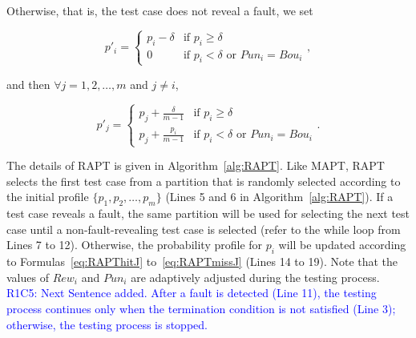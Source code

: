 \documentclass[10pt,journal,compsoc]{IEEEtran}
\begin{document}
Otherwise, that is, the test case does not reveal a fault, we set

\begin{equation}
\label{eq:RAPTmissI}
p'_i =
\begin{cases}
p_i - \delta & \text{if } p_i \geq \delta \\
0 & \text{if } p_i < \delta \text{ or } Pun_i = Bou_i
\end{cases},
\end{equation}

and then $\forall j = 1, 2, \ldots, m$ and $j \neq i$,

\begin{equation}
\label{eq:RAPTmissJ}
p'_j =
\begin{cases}
p_j + \displaystyle\frac{\delta}{m-1} & \text{if } p_i \geq \delta \\
p_j + \displaystyle\frac{p_i}{m-1} & \text{if } p_i < \delta \text{ or } Pun_i = Bou_i
\end{cases}.
\end{equation}

The details of RAPT is given in Algorithm~\ref{alg:RAPT}. Like MAPT, RAPT selects the first test case from a partition that is randomly selected according to the initial profile $\{p_1, p_2, \ldots, p_m\}$ (Lines 5 and 6 in Algorithm~\ref{alg:RAPT}). If a test case reveals a fault, the same partition will be used for selecting the next test case until a non-fault-revealing test case is selected (refer to the while loop from Lines 7 to 12). Otherwise, the probability profile for $p_i$ will be updated according to Formulas~\ref{eq:RAPThitJ} to~\ref{eq:RAPTmissJ} (Lines 14 to 19). Note that the values of $Rew_i$ and $Pun_i$ are adaptively adjusted during the testing process. \textcolor{blue}{R1C5: Next Sentence added.
After a fault is detected (Line 11), the testing process continues only when the termination condition is not satisfied (Line 3); otherwise, the testing process is stopped.}
\end{document}

